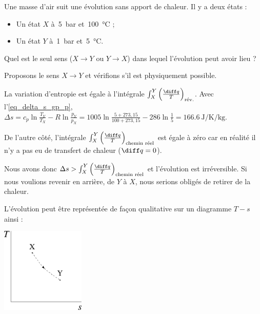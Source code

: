 		\begin{anexample}
			Une masse d’air suit une évolution sans apport de chaleur. Il y a deux états :
				\begin{itemize}
					\item Un état $X$ à~\SI{5}{\bar} et~\SI{100}{\degreeCelsius} ;
					\item Un état $Y$ à~\SI{1}{\bar} et~\SI{5}{\degreeCelsius}.
				\end{itemize}
			Quel est le seul sens ($X \to Y$ ou $Y \to X$) dans lequel l’évolution peut avoir lieu ?
						
				\begin{answer}
					Proposons le sens $X \to Y$ et vérifions s’il est physiquement possible.
					
					La variation d’entropie est égale à l’intégrale $\int_X^Y \left(\frac{\diff q}{T}\right)_\text{rév.}$. Avec l’\cref{eq_delta_s_gp_p}, $\Delta s = c_p \ln \frac{T_Y}{T_X} - R \ln \frac{p_Y}{p_X} = \num{1005} \ln \frac{5+273,15}{100+273,15} - \num{286} \ln\frac{1}{5}=  \SI{+166,6}{\joule\per\kelvin\per\kilogram}$.

					De l’autre côté, l’intégrale $\int_X^Y \left(\frac{\diff q}{T}\right)_\text{chemin réel}$ est égale à zéro car en réalité il n’y a pas eu de transfert de chaleur ($\diff q = 0$).
					
					Nous avons donc $\Delta s > \int_X^Y \left(\frac{\diff q}{T}\right)_\text{chemin réel}$ et l’évolution est irréversible. Si nous voulions revenir en arrière, de $Y$ à $X$, nous serions obligés de retirer de la chaleur.
					
					L’évolution peut être représentée de façon qualitative sur un diagramme $T-s$ ainsi :
						\begin{center}\includegraphics[width=4cm]{images/exe_ts_7.png}\end{center}
				\end{answer}
		\end{anexample}

		

